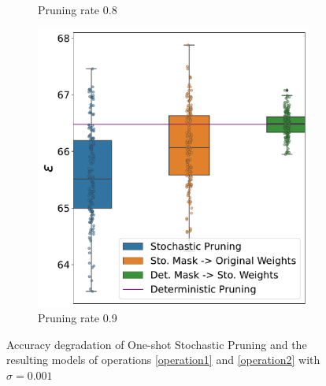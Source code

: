 \begin{figure}[!htb]
\begin{subfigure}[b]{0.65\columnwidth}
    \caption{ Pruning rate 0.8} 
    \label{fig:pr0.8sigma0.001}
     \end{subfigure}
    \hfill
     \begin{subfigure}[b]{0.65\columnwidth}
         \centering
     \includegraphics[width=\columnwidth]{figures/epsilon_allN_all_pr_0.9_sigma=0.001.pdf}
    \caption{ Pruning rate 0.9} 
    \label{fig:pr0.9sigma0.001}
     \end{subfigure}
     \caption{Accuracy degradation of One-shot Stochastic Pruning and the resulting models of operations \ref{operation1} and \ref{operation2} with $\sigma=0.001$}
     \label{fig:sigma0.001}
\end{figure}

